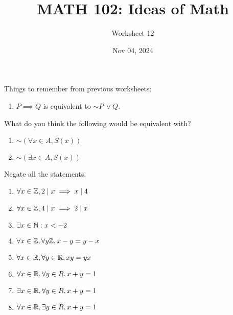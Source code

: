 \documentclass[12pt]{amsart}
\title{ MATH 102: Ideas  of Math }
\author{ Worksheet 12 }
\date{Nov 04, 2024}
\begin{document}
\maketitle
Things to remember from previous worksheets:

\begin{enumerate}
	\item $P \implies Q$ is equivalent to $\sim P \, \vee Q$.
\end{enumerate}


\begin{definition}
	What do you think the following would be equivalent with?
	\begin{enumerate}
		\item $\sim \left( \forall x \in A, S(x)  \right)$
		      \vspace{3cm}
		\item $\sim \left( \exists x \in A, S(x)  \right)$
		      \vspace{3cm}
	\end{enumerate}
\end{definition}
\newpage

\begin{problem}
Negate all the statements.

\begin{enumerate}
	\item $\forall x \in \mathbb{Z}, 2 \mid  x \implies x \mid 4$
	      \vspace{3cm}
	\item $\forall x\in \mathbb{Z}, 4 \mid x \implies 2 \mid x$
	      \vspace{3cm}
	\item $\exists x \in \mathbb{N}: x< -2$
	      \vspace{3cm}
	\item $\forall x \in \mathbb{Z}, \forall y \mathbb{Z}, x-y = y -x $
	      \vspace{3cm}
	\item $\forall x \in \mathbb{R}, \forall y \in \mathbb{R}, xy = yx$
	      \vspace{3cm}
	\item $\forall x\in \mathbb{R}, \forall y \in R, x + y = 1$
	      \vspace{3cm}
	\item $\exists x\in \mathbb{R}, \forall y \in R, x + y = 1$
	      \vspace{3cm}
	\item $\forall x\in \mathbb{R}, \exists y \in R, x + y = 1$
	      \vspace{3cm}
\end{enumerate}
\end{problem}
\end{document}
